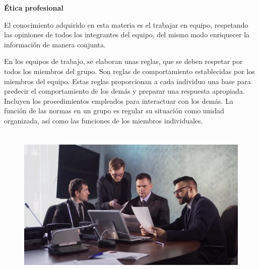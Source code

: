 \documentclass[12pt]{article}
\begin{document}
\par


\vspace{\baselineskip}

\vspace{\baselineskip}
\textbf{Ética profesional}\par

El conocimiento adquirido en esta materia es el trabajar en equipo, respetando las opiniones de todos los integrantes del equipo, del mismo modo enriquecer la información de manera conjunta. \par

En los equipos de trabajo, se elaboran unas reglas, que se deben respetar por todos los miembros del grupo. Son reglas de comportamiento establecidas por los miembros del equipo. Estas reglas proporcionan a cada individuo una base para predecir el comportamiento de los demás y preparar una respuesta apropiada. Incluyen los procedimientos empleados para interactuar con los demás. La función de las normas en un grupo es regular su situación como unidad organizada, así como las funciones de los miembros individuales.\par





\begin{figure}[H]
	\begin{Center}
		\includegraphics[width=5.3in,height=2.98in]{./media/image7.jpeg}
	\end{Center}
\end{figure}




\par


\vspace{\baselineskip}
\end{document}

